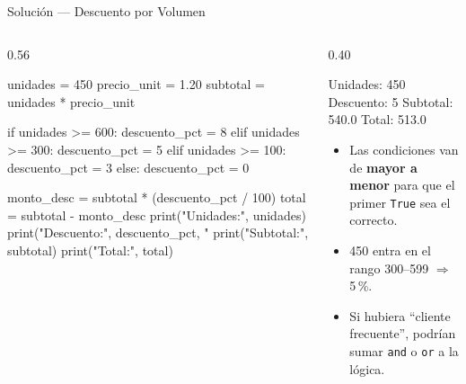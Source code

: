 \documentclass[aspectratio=169, 11pt]{beamer}
\begin{document}
\begin{frame}[fragile,shrink=40]{Solución --- Descuento por Volumen}
  \vspace{-6pt}
  \begin{columns}[T]
    \begin{column}{0.56\textwidth}
      \begin{pyblock}
unidades = 450
precio_unit = 1.20
subtotal = unidades * precio_unit

if unidades >= 600:
    descuento_pct = 8
elif unidades >= 300:
    descuento_pct = 5
elif unidades >= 100:
    descuento_pct = 3
else:
    descuento_pct = 0

monto_desc = subtotal * (descuento_pct / 100)
total = subtotal - monto_desc
print("Unidades:", unidades)
print("Descuento:", descuento_pct, "%
print("Subtotal:", subtotal)
print("Total:", total)
      \end{pyblock}
    \end{column}

    \begin{column}{0.40\textwidth}
      \vspace{4pt}
      \begin{outputblock}
Unidades: 450
Descuento: 5 %
Subtotal: 540.0
Total: 513.0
      \end{outputblock}

      \vspace{6pt}
      {\footnotesize\color{textMuted}
      \begin{itemize}\setlength{\itemsep}{4pt}
        \item[{\color{codeGreen}\scriptsize\faCheck}]
          Las condiciones van de \textbf{mayor a menor}
          para que el primer \texttt{True} sea el correcto.
        \item[{\color{codeGreen}\scriptsize\faCheck}]
          450 entra en el rango 300--599 $\Rightarrow$ 5\,\%.
        \item[{\color{arcaRed}\scriptsize\faLightbulb}]
          Si hubiera ``cliente frecuente'', podrían
          sumar \texttt{and} o \texttt{or} a la lógica.
      \end{itemize}
      }
    \end{column}
  \end{columns}
\end{frame}
\end{document}
